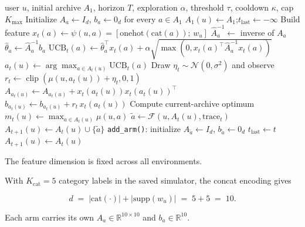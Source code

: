 \documentclass{article} %
\begin{document}
\begin{algorithm}[h]
\caption{Disjoint LinUCB with growing arm set (per-user)}
\label{alg:disjoint-linucb}
\begin{algorithmic}[1]
\Require user $u$, initial archive $A_1$, horizon $T$, exploration $\alpha$, threshold $\tau$, cooldown $\kappa$, cap $K_{\max}$
\State Initialize $A_a \gets I_d$, $b_a \gets 0_d$ for every $a \in A_1$
\State $A_1(u) \gets A_1$;\quad $t_{\text{last}} \gets -\infty$
        \State Build feature $x_t(a) \gets \psi(u, a) = [\mathrm{onehot}(\mathrm{cat}(a));\, w_u]$
        \State $\widehat{A}_a^{-1} \gets$ inverse of $A_a$
        \State $\hat\theta_a \gets \widehat{A}_a^{-1} b_a$
        \State $\mathrm{UCB}_t(a) \gets \hat\theta_a^\top x_t(a) + \alpha \sqrt{\max(0, x_t(a)^\top \widehat{A}_a^{-1} x_t(a))}$
    \EndFor
    \State $a_t(u) \gets \arg\max_{a \in A_t(u)} \mathrm{UCB}_t(a)$
    \State Draw \(\eta_t\sim\mathcal N(0,\sigma^2)\) and observe
    \(r_t\gets\operatorname{clip}(\mu(u,a_t(u))+\eta_t,0,1)\)
    \State $A_{a_t(u)} \gets A_{a_t(u)} + x_t(a_t(u)) x_t(a_t(u))^\top$
    \State $b_{a_t(u)} \gets b_{a_t(u)} + r_t \, x_t(a_t(u))$
    \State Compute current-archive optimum $m_t(u) \gets \max_{a \in A_t(u)} \mu(u, a)$
        \State $\tilde a \gets \mathcal{F}(u, A_t(u), \text{trace}_t)$ 
        \State $A_{t+1}(u) \gets A_t(u) \cup \{\tilde a\}$
        \State \texttt{add\_arm()}: initialize $A_{\tilde a} \gets I_d$, $b_{\tilde a} \gets 0_d$
        \State $t_{\text{last}} \gets t$
    \Else
        \State $A_{t+1}(u) \gets A_t(u)$
    \EndIf
\EndFor
\end{algorithmic}
\end{algorithm}

The feature dimension is fixed across all environments.

With \(K_{\mathrm{cat}}=5\) category labels in the saved simulator, the concat
encoding gives

\begin{equation}
\label{eq:app-impl-d}
d \;=\; |\mathrm{cat}(\cdot)| + |\mathrm{supp}(w_u)| \;=\; 5 + 5 \;=\; 10.
\end{equation}

Each arm carries its own $A_a \in \mathbb{R}^{10\times 10}$ and $b_a \in \mathbb{R}^{10}$.
\end{document}
